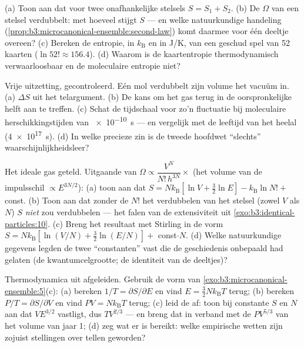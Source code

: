 \begin{exercise}[$\star$]\label{exo:b3:microcanonical-ensemble:3}
(a) Toon aan dat voor twee onafhankelijke stelsels $S = S_1 + S_2$. (b) De
$\Omega$ van een stelsel verdubbelt: met hoeveel stijgt $S$ --- en welke
natuurkundige handeling
(\cref{prop:b3:microcanonical-ensemble:second-law}) komt daarmee voor één
deeltje overeen? (c) Bereken de entropie, in $k_{\text{B}}$ en in J/K, van
een geschud spel van 52 kaarten ($\ln52! \approx 156.4$). (d) Waarom is de
kaartentropie thermodynamisch verwaarloosbaar en de moleculaire entropie
niet?
\end{exercise}

\begin{exercise}[$\star$]\label{exo:b3:microcanonical-ensemble:4}
Vrije uitzetting, gecontroleerd. Eén mol verdubbelt zijn volume het vacuüm
in. (a) $\Delta S$ uit het telargument. (b) De kans om het gas terug in de
oorspronkelijke helft aan te treffen. (c) Schat de tijdschaal voor zo'n
fluctuatie bij moleculaire herschikkingstijden van \qty{e-10}{s} --- en
vergelijk met de leeftijd van het heelal (\qty{4e17}{s}). (d) In welke
precieze zin is de tweede hoofdwet ``slechts'' waarschijnlijkheidsleer?
\end{exercise}

\begin{exercise}[$\star\star$]\label{exo:b3:microcanonical-ensemble:5}
Het ideale gas geteld. Uitgaande van $\Omega \propto \dfrac{V^N}{N!\,h^{3N}}\times$ (het volume van de impulsschil $\propto E^{3N/2}$): (a) toon aan dat $S = Nk_{\text{B}}[\ln V +
\tfrac32\ln E] - k_{\text{B}}\ln N! + $ const. (b) Toon aan dat zonder de $N!$ het
verdubbelen van het stelsel (zowel $V$ als $N$) $S$ \emph{niet} zou
verdubbelen --- het falen van de extensiviteit uit
\cref{exo:b3:identical-particles:10}. (c) Breng het resultaat met Stirling
in de vorm $S = Nk_{\text{B}}[\ln(V/N) + \tfrac32\ln(E/N)]
+ $
const$\cdot N$. (d) Welke natuurkundige gegevens legden de twee
``constanten'' vast die de geschiedenis onbepaald had gelaten (de
kwantumcelgrootte; de identiteit van de deeltjes)?
\end{exercise}

\begin{exercise}[$\star\star$]\label{exo:b3:microcanonical-ensemble:6}
Thermodynamica uit afgeleiden. Gebruik de vorm van
\cref{exo:b3:microcanonical-ensemble:5}(c): (a) bereken $1/T =
\partial S/\partial E$ en vind $E = \tfrac32 Nk_{\text{B}}T$ terug; (b) bereken
$P/T = \partial S/\partial V$ en vind $PV =
Nk_{\text{B}}T$ terug; (c) leid
de  af: toon bij constante $S$ en $N$ aan dat
$VE^{3/2}$ vastligt, dus $TV^{2/3}$ --- en breng dat in verband met de
$PV^{5/3}$ van het volume van jaar 1; (d) zeg wat er is bereikt: welke
empirische wetten zijn zojuist stellingen over tellen geworden?
\end{exercise}

